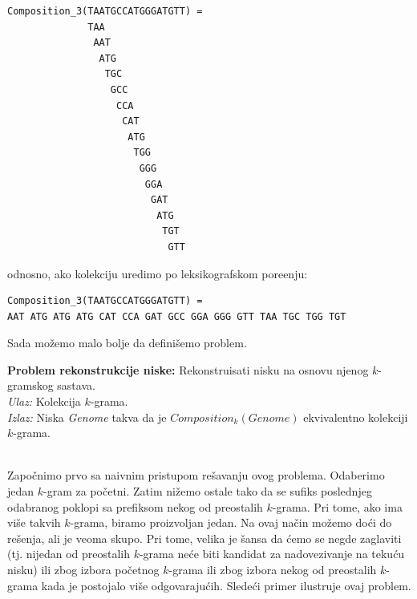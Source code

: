 \newpage
\begin{lstlisting}
Composition_3(TAATGCCATGGGATGTT) =
              TAA 
               AAT 
                ATG
                 TGC
                  GCC
                   CCA
                    CAT
                     ATG
                      TGG
                       GGG
                        GGA
                         GAT
                          ATG
                           TGT
                            GTT
\end{lstlisting}

\noindent odnosno, ako kolekciju uredimo po leksikografskom pore\dj enju:

\begin{lstlisting}
Composition_3(TAATGCCATGGGATGTT) =
AAT ATG ATG ATG CAT CCA GAT GCC GGA GGG GTT TAA TGC TGG TGT
\end{lstlisting}

Sada možemo malo bolje da definišemo problem.
~ \\
\begin{tcolorbox}
	\textbf{Problem rekonstrukcije niske:} Rekonstruisati nisku na osnovu njenog $k$-gramskog sastava. \\
	\textit{Ulaz:} Kolekcija $k$-grama.\\
	\textit{Izlaz:} Niska \emph{Genome} takva da je $Composition_k(Genome)$ ekvivalentno kolekciji $k$-grama.
\end{tcolorbox}

~\\

Zapo\v cnimo prvo sa naivnim pristupom re\v savanju ovog problema. Odaberimo jedan $k$-gram za početni. Zatim nižemo ostale tako da se sufiks poslednjeg odabranog poklopi sa prefiksom nekog od preostalih $k$-grama. Pri tome, ako ima više takvih $k$-grama, biramo proizvoljan jedan. Na ovaj način možemo doći do rešenja, ali je veoma skupo. Pri tome, velika je šansa da ćemo se negde zaglaviti (tj. nijedan od preostalih $k$-grama neće biti kandidat za nadovezivanje na tekuću nisku) ili zbog izbora početnog $k$-grama ili zbog izbora nekog od preostalih $k$-grama kada je postojalo više odgovarajućih. Sledeći primer ilustruje ovaj problem.

